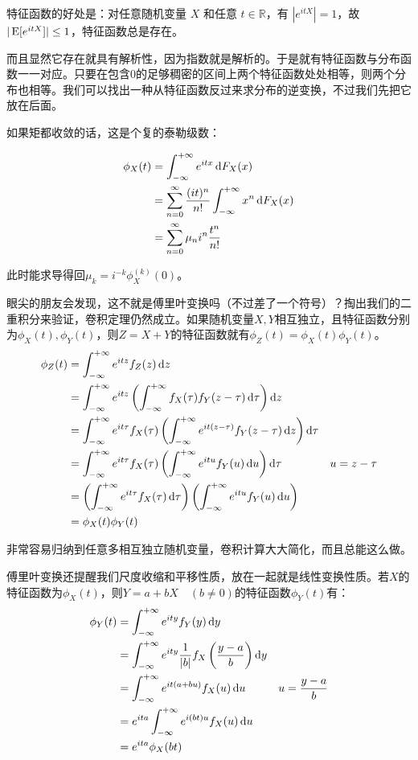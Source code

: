 特征函数的好处是：对任意随机变量 $X$ 和任意 $t \in \mathbb{R}$，有 $|e^{itX}| = 1$，故 $|\operatorname{E}[e^{itX}]| \le 1$，特征函数总是存在。

而且显然它存在就具有解析性，因为指数就是解析的。于是就有特征函数与分布函数一一对应。只要在包含$0$的足够稠密的区间上两个特征函数处处相等，则两个分布也相等。我们可以找出一种从特征函数反过来求分布的逆变换，不过我们先把它放在后面。

如果矩都收敛的话，这是个复的泰勒级数：

\begin{align*}
\phi_X(t) &=\int_{-\infty}^{+\infty} e^{itx} \mathop{}\!\mathrm{d} F_X(x) \\
&=\sum_{n=0}^{\infty}\frac{(it)^n}{n!}\int_{-\infty}^{+\infty}x^n \mathop{}\!\mathrm{d} F_X(x)\\
&=\sum_{n=0}^{\infty}\mu_ni^n\frac{t^n}{n!}\\
\end{align*}

此时能求导得回$\mu_k=i^{-k} \phi_X^{(k)}(0)$。

眼尖的朋友会发现，这不就是傅里叶变换吗（不过差了一个符号）？掏出我们的二重积分来验证，卷积定理仍然成立。如果随机变量$X,Y$相互独立，且特征函数分别为$\phi_X(t),\phi_Y(t)$，则$Z=X+Y$的特征函数就有$\phi_Z(t)=\phi_X(t)\phi_Y(t)$。
\begin{align*}
\phi_Z(t)&= \int_{-\infty}^{+\infty}e^{itz}f_Z(z)\dif z\\
&= \int_{-\infty}^{+\infty}e^{itz}\left(\int_{-\infty}^{+\infty}f_X(\tau)f_Y(z-\tau)\dif \tau\right)\dif z\\
&= \int_{-\infty}^{+\infty}e^{it\tau}f_X(\tau)\left(\int_{-\infty}^{+\infty}e^{it(z-\tau)}f_Y(z-\tau)\dif z\right)\dif \tau\\
&= \int_{-\infty}^{+\infty}e^{it\tau}f_X(\tau)\left(\int_{-\infty}^{+\infty}e^{itu}f_Y(u)\dif u\right)\dif \tau & u= z-\tau\\
&= \left(\int_{-\infty}^{+\infty}e^{it\tau}f_X(\tau)\dif \tau\right)\left(\int_{-\infty}^{+\infty}e^{itu}f_Y(u)\dif u\right)\\
&= \phi_X(t)\phi_Y(t)
\end{align*}

非常容易归纳到任意多相互独立随机变量，卷积计算大大简化，而且总能这么做。

傅里叶变换还提醒我们尺度收缩和平移性质，放在一起就是线性变换性质。若$X$的特征函数为$\phi_X(t)$，则$Y=a+bX\quad(b\neq 0)$的特征函数$\phi_Y(t)$有：
\begin{align*}
\phi_Y(t) &=\int_{-\infty}^{+\infty}e^{ity}f_Y(y)\mathop{}\!\mathrm{d} y\\
&= \int_{-\infty}^{+\infty}e^{ity}\frac1{|b|}f_X\left(\frac{y-a}{b}\right)\mathop{}\!\mathrm{d} y\\
&= \int_{-\infty}^{+\infty} e^{it(a+bu)} f_X(u)\mathop{}\!\mathrm{d} u & u=\frac{y-a}{b}\\
&= e^{ita}\int_{-\infty}^{+\infty} e^{i(bt)u} f_X(u)\mathop{}\!\mathrm{d} u\\
&=e^{ita} \phi_X(bt)
\end{align*}

